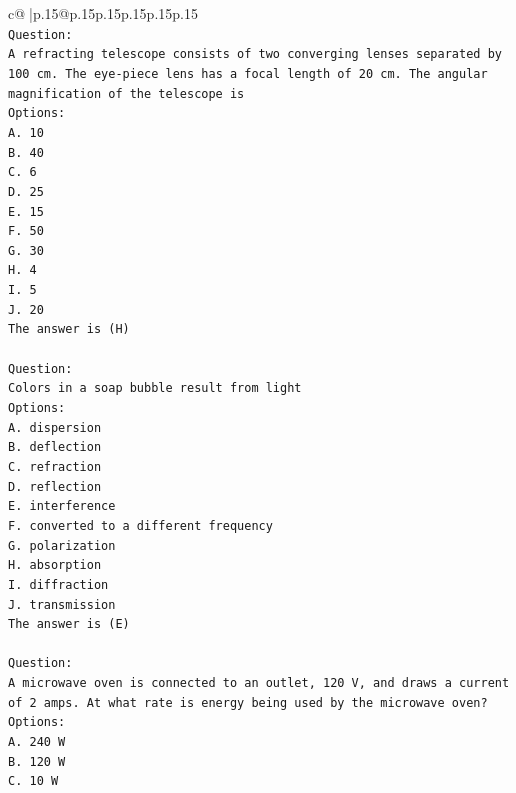 \documentclass{article}
\begin{document}
{\begin{supertabular}{c@{$\;$}|p{.15\linewidth}@{}p{.15\linewidth}p{.15\linewidth}p{.15\linewidth}p{.15\linewidth}p{.15\linewidth}}
{{{\\ 
\texttt{Question:} \\
\texttt{A refracting telescope consists of two converging lenses separated by 100 cm. The eye{-}piece lens has a focal length of 20 cm. The angular magnification of the telescope is} \\
\texttt{Options:} \\
\texttt{A. 10} \\
\texttt{B. 40} \\
\texttt{C. 6} \\
\texttt{D. 25} \\
\texttt{E. 15} \\
\texttt{F. 50} \\
\texttt{G. 30} \\
\texttt{H. 4} \\
\texttt{I. 5} \\
\texttt{J. 20} \\
\texttt{The answer is (H)} \\
\\ 
\texttt{Question:} \\
\texttt{Colors in a soap bubble result from light} \\
\texttt{Options:} \\
\texttt{A. dispersion} \\
\texttt{B. deflection} \\
\texttt{C. refraction} \\
\texttt{D. reflection} \\
\texttt{E. interference} \\
\texttt{F. converted to a different frequency} \\
\texttt{G. polarization} \\
\texttt{H. absorption} \\
\texttt{I. diffraction} \\
\texttt{J. transmission} \\
\texttt{The answer is (E)} \\
\\ 
\texttt{Question:} \\
\texttt{A microwave oven is connected to an outlet, 120 V, and draws a current of 2 amps. At what rate is energy being used by the microwave oven?} \\
\texttt{Options:} \\
\texttt{A. 240 W} \\
\texttt{B. 120 W} \\
\texttt{C. 10 W} \\
}}}
\end{supertabular}}
\end{document}
